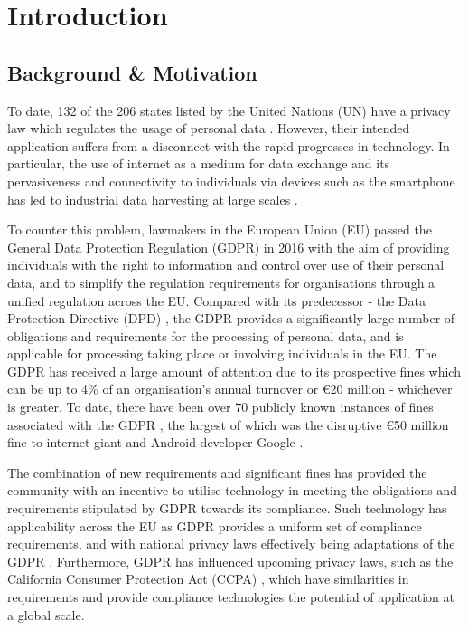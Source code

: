 \chapter{Introduction}
\label{chapter:introduction}

\section{Background \& Motivation}
To date, 132 of the 206 states listed by the United Nations (UN) have a privacy law which regulates the usage of personal data \cite{greenleaf_global_2019}.
However, their intended application suffers from a disconnect with the rapid progresses in technology. In particular, the use of internet as a medium for data exchange and its pervasiveness and connectivity to individuals via devices such as the smartphone has led to industrial data harvesting at large scales \cite{christl_networks_2016}. 

To counter this problem, lawmakers in the European Union (EU) passed the General Data Protection Regulation (GDPR) \cite{noauthor_regulation_2016} in 2016 with the aim of providing individuals with the right to information and control over use of their personal data, and to simplify the regulation requirements for organisations through a unified regulation across the EU.
Compared with its predecessor - the Data Protection Directive (DPD) \cite{noauthor_directive_1995}, the GDPR provides a significantly large number of obligations and requirements for the processing of personal data, and is applicable for processing taking place or involving individuals in the EU.
The GDPR has received a large amount of attention due to its prospective fines which can be up to 4\% of an organisation's annual turnover or €20 million - whichever is greater. 
To date, there have been over 70 publicly known instances of fines associated with the GDPR \cite{noauthor_gdpr_nodate}, the largest of which was the disruptive €50 million fine to internet giant and Android developer Google \cite{noauthor_cnils_2019}.

The combination of new requirements and significant fines has provided the community with an incentive to utilise technology in meeting the obligations and requirements stipulated by GDPR towards its compliance. 
Such technology has applicability across the EU as GDPR provides a uniform set of compliance requirements, and with national privacy laws effectively being adaptations of the GDPR \cite{mccullagh_national_2019}.
Furthermore, GDPR has influenced upcoming privacy laws, such as the California Consumer Protection Act (CCPA) \cite{noauthor_assembly_2018}, which have similarities in requirements and provide compliance technologies the potential of application at a global scale.

